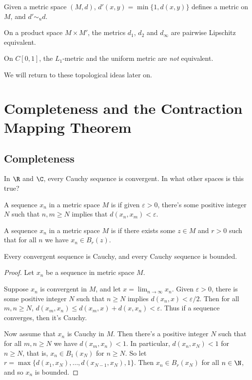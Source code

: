 \begin{example}
    Given a metric space $(M, d)$, $d'(x, y) = \min\{1, d(x, y)\}$ defines a metric on $M$, and $d' \sim_u d$.
\end{example}

\begin{example}
    On a product space $M \times M'$, the metrics $d_1$, $d_2$ and $d_{\infty}$ are pairwise Lipschitz equivalent.
\end{example}

\begin{example}
    On $C[0, 1]$, the $L_1$-metric and the uniform metric are \emph{not} equivalent.
\end{example}

We will return to these topological ideas later on.

\section{Completeness and the Contraction Mapping Theorem}

\subsection{Completeness}

In $\R$ and $\C$, every Cauchy sequence is convergent. In what other spaces is this true?

\begin{definition}
    A sequence $x_n$ in a metric space $M$ is  if given $\varepsilon > 0$, there's some positive integer $N$ such that $n, m \geq N$ implies that $d(x_n, x_m) < \varepsilon$.
\end{definition}

\begin{definition}[Bounded]
    A sequence $x_n$ in a metric space $M$ is  if there exists some $z \in M$ and $r > 0$ such that for all $n$ we have $x_n \in B_r(z)$.
\end{definition}

\begin{lemma}
    Every convergent sequence is Cauchy, and every Cauchy sequence is bounded.
\end{lemma}
\begin{proof}
    Let $x_n$ be a sequence in metric space $M$. 
    
    Suppose $x_n$ is convergent in $M$, and let $x = \lim_{n \to \infty} x_n$.
    Given $\varepsilon > 0$, there is some positive integer $N$ such that $n \geq N$ implies $d(x_n, x) < \varepsilon/2$.
    Then for all $m, n \geq N$, $d(x_m, x_n) \leq d(x_m, x) + d(x, x_n) < \varepsilon$. Thus if a sequence converges, then it's Cauchy.

    Now assume that $x_n$ is Cauchy in $M$. Then there's a positive integer $N$ such that for all $m, n \geq N$ we have $d(x_m, x_n) < 1$. In particular, $d(x_n, x_N) < 1$ for $n \geq N$, that is, $x_n \in B_1(x_N)$ for $n \geq N$.
    So let $r = \max\{d(x_1, x_N), \dots, d(x_{N - 1}, x_N), 1\}$. Then $x_n \in B_r(x_N)$ for all $n \in \N$, and so $x_n$ is bounded.
\end{proof}


